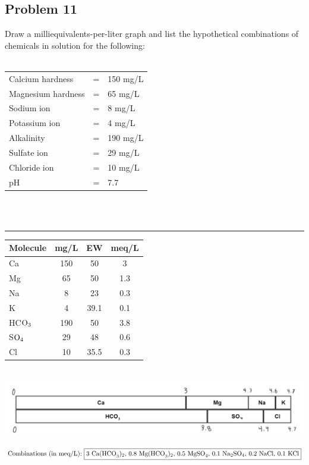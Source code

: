 \subsection*{Problem 11}
Draw a milliequivalents-per-liter graph and list the hypothetical combinations of chemicals in solution for the following:\\\\
\begin{tabular}{l c l}
    Calcium hardness & = & 150 mg/L \\
    Magnesium hardness & = & 65 mg/L \\
    Sodium ion & = & 8 mg/L \\
    Potassium ion & = & 4 mg/L \\
    Alkalinity & = & 190 mg/L \\
    Sulfate ion & = & 29 mg/L \\
    Chloride ion & = & 10 mg/L \\
    pH & = &  7.7
\end{tabular}
\\\\\rule{5cm}{1pt}
\begin{center}
\begin{tabular}{l c c c}
    Molecule & mg/L & EW & meq/L\\
    \hline
    Ca & 150 & 50 & 3\\
    Mg & 65 & 50 & 1.3\\
    Na & 8 & 23 & 0.3\\
    K & 4 & 39.1 & 0.1\\
    HC\(\textnormal{O}_3\) & 190 & 50 & 3.8\\
    S\(\textnormal{O}_4\) & 29 & 48 & 0.6\\
    Cl & 10 & 35.5 & 0.3
\end{tabular}\\
\includegraphics[scale=0.33]{diagram3.png}
\end{center}
\[\textnormal{Combinations (in meq/L): } \boxed{3 \textnormal{ Ca(HCO}_3)_2,\,0.8 \textnormal{ Mg(HCO}_3)_2,\,0.5\textnormal{ MgSO}_4,\,0.1\textnormal{ Na}_2\textnormal{SO}_4,\,0.2\textnormal{ NaCl},\,0.1\textnormal{ KCl}}\]
